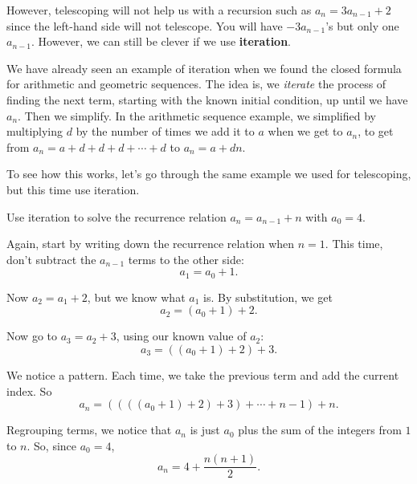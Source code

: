 \documentclass[11pt,]{book}
\newcommand{\terminology}[1]{\textbf{#1}}
\theoremstyle{ptxplainnotitle}
\theoremstyle{ptxplaintitle}
\theoremstyle{ptxdefinitionnotitle}
\theoremstyle{ptxdefinitiontitle}
\theoremstyle{ptxdefinitionnotitle}
\theoremstyle{ptxdefinitiontitle}
\theoremstyle{ptxdefinitionnotitle}
\theoremstyle{ptxdefinitiontitle}
\theoremstyle{ptxdefinitiontitlenonumber}
\theoremstyle{ptxdefinitiontitlenonumber}
\numberwithin{equation}{chapter}
\begin{document}
\par
\hypertarget{p-439}{}%
However, telescoping will not help us with a recursion such as \(a_n = 3a_{n-1} + 2\) since the left-hand side will not telescope. You will have \(-3a_{n-1}\)'s but only one \(a_{n-1}\). However, we can still be clever if we use \terminology{iteration}.%
\par
\hypertarget{p-440}{}%
We have already seen an example of iteration when we found the closed formula for arithmetic and geometric sequences. The idea is, we \emph{iterate} the process of finding the next term, starting with the known initial condition, up until we have \(a_n\). Then we simplify. In the arithmetic sequence example, we simplified by multiplying \(d\) by the number of times we add it to \(a\) when we get to \(a_n\), to get from \(a_n = a + d + d + d + \cdots + d\) to \(a_n = a + dn\).%
\par
\hypertarget{p-441}{}%
To see how this works, let's go through the same example we used for telescoping, but this time use iteration.%
\begin{example}\label{example-21}
\hypertarget{p-442}{}%
Use iteration to solve the recurrence relation \(a_n = a_{n-1} + n\) with \(a_0 = 4\).%
\par\smallskip%
\noindent\textbf{}\hypertarget{solution-67}{}\hypertarget{p-443}{}%
Again, start by writing down the recurrence relation when \(n = 1\). This time, don't subtract the \(a_{n-1}\) terms to the other side:%
\begin{equation*}
a_1 = a_0 + 1.
\end{equation*}
%
\par
\hypertarget{p-444}{}%
Now \(a_2 = a_1 + 2\), but we know what \(a_1\) is. By substitution, we get%
\begin{equation*}
a_2 = (a_0 + 1) + 2.
\end{equation*}
%
\par
\hypertarget{p-445}{}%
Now go to \(a_3 = a_2 + 3\), using our known value of \(a_2\):%
\begin{equation*}
a_3 = ((a_0 + 1) + 2) + 3.
\end{equation*}
%
\par
\hypertarget{p-446}{}%
We notice a pattern. Each time, we take the previous term and add the current index. So%
\begin{equation*}
a_n = ((((a_0 + 1) +2)+3)+\cdots + n-1) + n.
\end{equation*}
%
\par
\hypertarget{p-447}{}%
Regrouping terms, we notice that \(a_n\) is just \(a_0\) plus the sum of the integers from \(1\) to \(n\). So, since \(a_0 = 4\),%
\begin{equation*}
a_n = 4 + \frac{n(n+1)}{2}.
\end{equation*}
%
\end{example}
\end{document}
